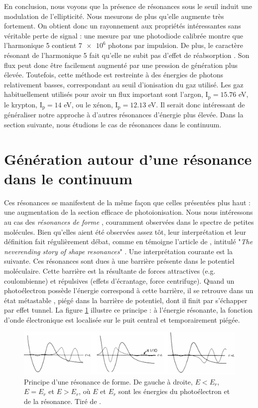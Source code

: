 En conclusion, nous voyons que la présence de résonances sous le seuil induit une modulation de l'ellipticité. Nous mesurons de plus qu'elle augmente très fortement. On obtient donc un rayonnement aux propriétés intéressantes sans véritable perte de signal : une mesure par une photodiode calibrée montre que l'harmonique 5 contient $\num{7e6}$ photons par impulsion. De plus, le caractère résonant de l'harmonique 5 fait qu'elle ne subit pas d'effet de réabsorption . Son flux peut donc être facilement augmenté par une pression de génération plus élevée.  Toutefois, cette méthode est restreinte à des énergies de photons relativement basses, correspondant au seuil d'ionisation du gaz utilisé. Les gaz habituellement utilisés pour avoir un flux important sont l'argon, $\text{I}_{\text{p}}=15.76$ eV, le krypton, $\text{I}_{\text{p}}=14$ eV, ou le xénon, $\text{I}_{\text{p}}=12.13$ eV. Il serait donc intéressant de généraliser notre approche à d'autres résonances d'énergie plus élevée. Dans la section suivante, nous étudions le cas de résonances dans le continuum.

\section{Génération autour d'une résonance dans le continuum}
Ces résonances se manifestent de la même façon que celles présentées plus haut : une augmentation de la section efficace de photoionisation. Nous nous intéressons au cas des \textit{résonances de forme} , couramment observées dans le spectre de petites molécules. Bien qu'elles aient été observées assez tôt, leur interprétation et leur définition fait régulièrement débat, comme en témoigne l'article de , intitulé "\textit{The neverending story of shape resonances}" . Une interprétation courante est la suivante. Ces résonances sont dues à une barrière présente dans le potentiel moléculaire. Cette barrière est la résultante de forces attractives (e.g. coulombienne) et répulsives (effets d'écrantage, force centrifuge). Quand un photoélectron possède l'énergie correspond à cette barrière, il se retrouve dans un état métastable , piégé dans la barrière de potentiel, dont il finit par s'échapper par effet tunnel. La figure \ref{fig:shaperesonance} illustre ce principe : à l'énergie résonante, la fonction d'onde électronique est localisée sur le puit central et temporairement piégée.

\begin{figure}[!ht]
\centering
\includegraphics[width=1\columnwidth]{Figures/ResonantArgon/shape_resonance.pdf}%
\caption{Principe d'une résonance de forme. De gauche à droite, $E<E_r$, $E=E_r$ et $E>E_r$, où $E$ et $E_r$ sont les énergies du photoélectron et de la résonance. Tiré de .}
\label{fig:shaperesonance}
\end{figure}

